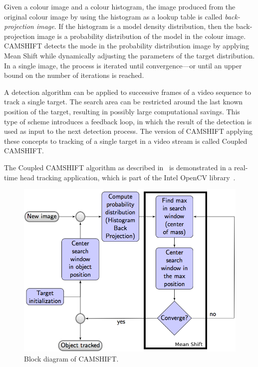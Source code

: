 \bigskip

Given a colour image and a colour histogram, the image produced from the original colour image by using the histogram as a lookup table is called \emph{back-projection image}. If the histogram is a model density distribution, then the back-projection image is a probability distribution of the model in the colour image. \acs{CAMSHIFT} detects the mode in the probability distribution image by applying Mean Shift while dynamically adjusting the parameters of the target distribution. In a single image, the process is iterated until convergence---or until an upper bound on the number of iterations is reached.

A detection algorithm can be applied to successive frames of a video sequence to track a single target. The search area can be restricted around the last known position of the target, resulting in possibly large computational savings. This type of scheme introduces a feedback loop, in which the result of the detection is used as input to the next detection process. The version of \ac{CAMSHIFT} applying these concepts to tracking of a single target in a video stream is called Coupled \ac{CAMSHIFT}.

The Coupled \ac{CAMSHIFT} algorithm as described in~\cite{bradski:1998} is demonstrated in a real-time head tracking application, which is part of the Intel OpenCV library~\cite{link:opencv}. 

\begin{figure}
\centering
\includegraphics[scale=0.4]{figures/camshift_diag2}
\caption[Block diagram of \acs{CAMSHIFT}]{Block diagram of \ac{CAMSHIFT}.}
\label{img:camshift_diag2}
\end{figure}

